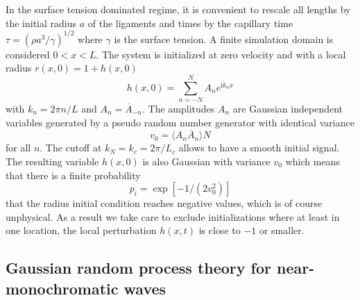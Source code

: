\newcommand\be{\begin{equation}}
\newcommand\nd{\end{equation}}
\newcommand\ii{{\textrm{i}}}

In the surface tension dominated regime, it is convenient to rescale all lengths by the
initial radius $a$ of the ligaments and times by the capillary time
$\tau = (\rho a^3/\gamma)^{1/2}$ where $\gamma$ is the surface tension.
A finite simulation domain is considered $0 < x < L$. 
The system is initialized at zero velocity and with a local radius $r(x,0) = 1 + h(x,0)$
\be
h(x,0) = \sum_{n=-N}^{N}  A_n e^{\ii k_n x}   \label{p1}
\nd
with $k_n=2\pi n / L$ and $A_n = \overline A_{-n}$. The amplitudes $A_n$ are Gaussian independent variables
generated by a pseudo random number generator with identical variance
\be
v_0 = \langle A_n \overline A_n \rangle N
\nd
for all $n$.
The cutoff at $k_N=k_c = 2\pi /L_c$ allows to have a smooth
initial signal. The resulting variable $h(x,0)$ is also Gaussian with variance $v_0$ which means that
there is a finite probability
\be
p_i = \exp[{-1/(2 v_0^2)}] \label{p2}
\nd
that the radius initial condition reaches negative values, which is of course unphysical. As a result
{we take care to exclude initializations where at least in one location, the local perturbation $h(x,t)$ is close to $-1$ or smaller.}

\subsection*{Gaussian random process theory for near-monochromatic waves}

